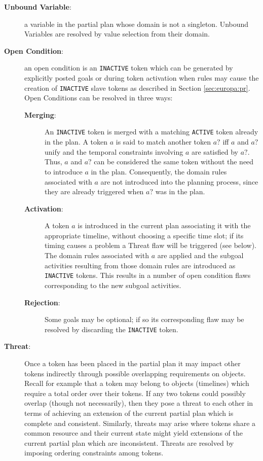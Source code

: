 \begin{description}

\item[\textbf{Unbound Variable}:] a variable in the partial plan whose
  domain is not a singleton. Unbound Variables are resolved by value
  selection from their domain.

\item[\textbf{Open Condition}:] an open condition is an
  \texttt{INACTIVE} token which can be generated by explicitly posted
  goals or during token activation when rules may cause the creation
  of \texttt{INACTIVE} slave tokens as described in Section
  \ref{sec:europa:pr}. Open Conditions can be resolved in three ways:

  \begin{description}

  \item[\textbf{Merging}:] An \texttt{INACTIVE} token is merged with a
    matching \texttt{ACTIVE} token already in the plan. A token $a$ is
    said to match another token $a?$ iff $a$ and $a?$ unify
    \cite{russelnorvig} and the temporal constraints involving $a$ are
    satisfied by $a?$. Thus, $a$ and $a?$ can be considered the same
    token without the need to introduce $a$ in the plan. Consequently,
    the domain rules associated with $a$ are not introduced into the
    planning process, since they are already triggered when $a?$ was
     in the plan.

  \item[\textbf{Activation}:] A token $a$ is introduced in the current
    plan associating it with the appropriate timeline, without
    choosing a specific time slot; if its timing causes a problem a
    Threat flaw will be triggered (see below).  The domain rules
    associated with $a$ are applied and the subgoal activities
    resulting from those domain rules are introduced as
    \texttt{INACTIVE} tokens.  This results in a number of open
    condition flaws corresponding to the new subgoal activities.

  \item[\textbf{Rejection}:] Some goals may be optional; if so its
    corresponding flaw may be resolved by discarding the
    \texttt{INACTIVE} token.

  \end{description}

\item[\textbf{Threat}:] Once a token has been placed in the partial
  plan it may impact other tokens indirectly through possible
  overlapping requirements on objects. Recall for example that a token
  may belong to objects (\eg timelines) which require a total order
  over their tokens. If any two tokens could possibly overlap (though
  not necessarily), then they pose a threat to each other in terms of
  achieving an extension of the current partial plan which is complete
  and consistent. Similarly, threats may arise where tokens share a
  common resource and their current state might yield extensions of
  the current partial plan which are inconsistent. Threats are
  resolved by imposing ordering constraints among tokens.

\end{description}

